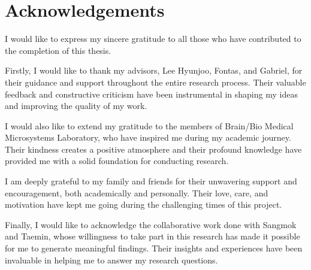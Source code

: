 \thispagestyle{main}
\chapter*{Acknowledgements}
I would like to express my sincere gratitude to all those who have contributed to the completion of this thesis.

Firstly, I would like to thank my advisors, Lee Hyunjoo, Fontas, and Gabriel, for their guidance and support throughout the entire research process. Their valuable feedback and constructive criticism have been instrumental in shaping my ideas and improving the quality of my work.

I would also like to extend my gratitude to the members of Brain/Bio Medical Microsystems Laboratory, who have inspired me during my academic journey. Their kindness creates a positive atmosphere and their profound knowledge have provided me with a solid foundation for conducting research.

I am deeply grateful to my family and friends for their unwavering support and encouragement, both academically and personally. Their love, care, and motivation have kept me going during the challenging times of this project.

Finally, I would like to acknowledge the collaborative work done with Sangmok and Taemin, whose willingness to take part in this research has made it possible for me to generate meaningful findings. Their insights and experiences have been invaluable in helping me to answer my research questions.
